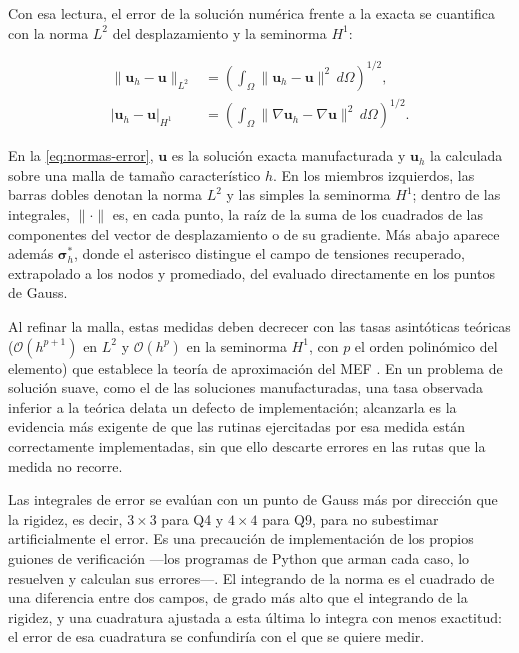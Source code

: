 Con esa lectura, el error de la solución numérica frente a la exacta se cuantifica con la norma $L^2$ del desplazamiento y la seminorma $H^1$:

\begin{equation}
\begin{aligned}
\|\bm{u}_h - \bm{u}\|_{L^2} &= \left( \int_\Omega \|\bm{u}_h - \bm{u}\|^2 \, d\Omega \right)^{1/2}, \\
|\bm{u}_h - \bm{u}|_{H^1} &= \left( \int_\Omega \|\nabla\bm{u}_h - \nabla\bm{u}\|^2 \, d\Omega \right)^{1/2}.
\end{aligned}
\label{eq:normas-error}
\end{equation}

En la \autoref{eq:normas-error}, $\bm{u}$ es la solución exacta manufacturada y $\bm{u}_h$ la calculada sobre una malla de tamaño característico $h$. En los miembros izquierdos, las barras dobles denotan la norma $L^2$ y las simples la seminorma $H^1$; dentro de las integrales, $\|\cdot\|$ es, en cada punto, la raíz de la suma de los cuadrados de las componentes del vector de desplazamiento o de su gradiente. Más abajo aparece además $\bm{\sigma}^*_h$, donde el asterisco distingue el campo de tensiones recuperado, extrapolado a los nodos y promediado, del evaluado directamente en los puntos de Gauss.

Al refinar la malla, estas medidas deben decrecer con las tasas asintóticas teóricas ($\mathcal{O}(h^{p+1})$ en $L^2$ y $\mathcal{O}(h^p)$ en la seminorma $H^1$, con $p$ el orden polinómico del elemento) que establece la teoría de aproximación del MEF \autocites[pp.~106-107]{strang2008analysis}[pp.~189-190]{hughes2000fem}. En un problema de solución suave, como el de las soluciones manufacturadas, una tasa observada inferior a la teórica delata un defecto de implementación; alcanzarla es la evidencia más exigente de que las rutinas ejercitadas por esa medida están correctamente implementadas, sin que ello descarte errores en las rutas que la medida no recorre.

Las integrales de error se evalúan con un punto de Gauss más por dirección que la rigidez, es decir, $3\times3$ para Q4 y $4\times4$ para Q9, para no subestimar artificialmente el error. Es una precaución de implementación de los propios guiones de verificación ---los programas de Python que arman cada caso, lo resuelven y calculan sus errores---. El integrando de la norma es el cuadrado de una diferencia entre dos campos, de grado más alto que el integrando de la rigidez, y una cuadratura ajustada a esta última lo integra con menos exactitud: el error de esa cuadratura se confundiría con el que se quiere medir.

